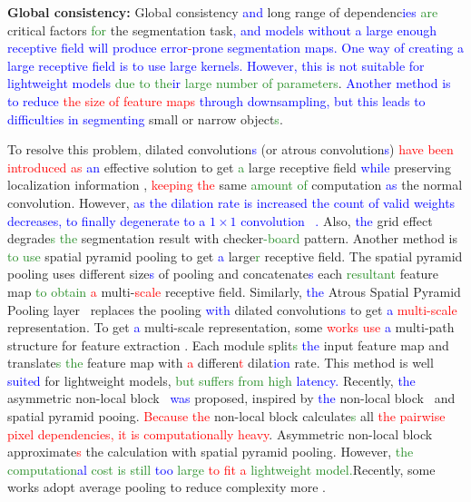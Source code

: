 \documentclass[10pt,twocolumn,letterpaper]{article}
\newcommand\Lars[1]{\textcolor{blue}{#1}}
\newcommand\yj[1]{\textcolor{ForestGreen}{#1}}
\newcommand\nj[1]{\textcolor{red}{#1}}
\newcommand\Lars[1]{#1}
\newcommand\yj[1]{#1}
\newcommand\nj[1]{#1}
\begin{document}
\noindent
\textbf{Global consistency:} 
Global consistency \Lars{and} long range of dependenc\Lars{ies} \yj{are} critical factors \yj{for} the segmentation task\Lars{, and models without a large enough receptive field will produce error\nj{-}prone segmentation maps. }\Lars{One way of creating a large receptive field is to use large kernels. However, this is not suitable for lightweight models}
\yj{due to the\Lars{ir} large number of parameters}.
\Lars{Another method is to reduce \nj{the size of feature maps} through downsampling, but this leads to difficulties in segmenting} small or narrow object\yj{s}. 

To resolve this problem\yj{,} dilated convolution\Lars{s} (or atrous convolution\Lars{s})
\nj{have been introduced as} \Lars{an} effective solution to get \yj{a} large receptive field \Lars{while} preserving localization information \cite{yu2015multi, chen2018deeplab}, \nj{keeping the} same \yj{amount of} computation \Lars{as} the normal convolution.
However, \Lars{as the dilation rate is increased the count of valid weights decreases, to finally degenerate to a $1\times 1$ convolution~ \cite{chen2017rethinking}. }Also, \Lars{the} grid effect degrade\yj{s the} segmentation result with checker\yj{-board} pattern.
Another method is \yj{to use} spatial pyramid pooling to get \Lars{a} large\yj{r} receptive field.
The spatial pyramid pooling uses different size\Lars{s} of pooling and concatenate\Lars{s} each \yj{resultant} feature map \yj{to obtain}  \nj{a} multi-\nj{scale} receptive field.
Similarly, \Lars{the} Atrous Spatial Pyramid Pooling layer~\cite{deeplabv3plus2018} replaces the pooling \Lars{with} dilated convolution\Lars{s} to get \Lars{a} \nj{multi-scale} representation. 
To get \Lars{a} multi-scale representation, some \nj{works use} \Lars{a} multi-path structure for feature extraction \cite{mehta2018espnet, mehta2018espnetv2, park2018concentrated}.
Each module split\yj{s} \Lars{the} input feature map and translate\yj{s the} feature map with \nj{a} differen\nj{t} dilat\Lars{ion} rate. 
This method is well \Lars{suited} for lightweight models, \yj{but suffers from high \Lars{latency. }}Recently, \Lars{the} asymmetric non-local block~\cite{zhu2019asymmetric} \Lars{was} proposed, inspired by \Lars{the} non-local block~\cite{wang2018non} and spatial pyramid pooing.
\nj{Because the} non-local block calculate\yj{s} all \nj{the pairwise pixel dependencies, it is computationally heavy}.
Asymmetric non-local block approximate\nj{s} the calculation with spatial pyramid pooling. However, \yj{the computation\Lars{al} cost is still \Lars{too} large \nj{to fit a} lightweight model.}Recently, some works adopt average pooling to reduce complexity more \cite{wang2019elastic, li2019hbonet}.
\end{document}
